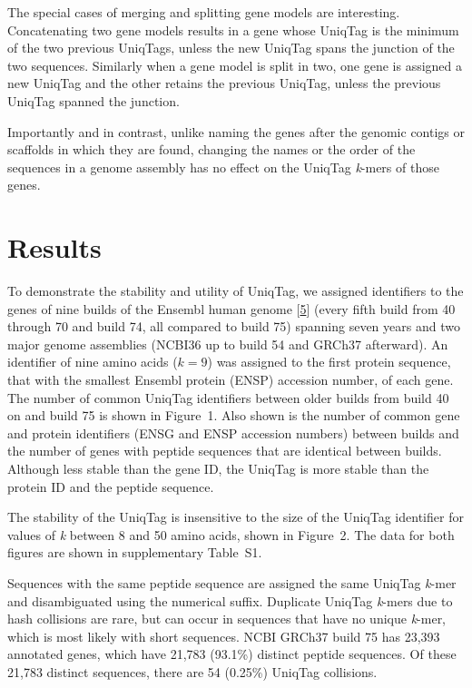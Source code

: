\documentclass[10pt]{article}
\begin{document}
The special cases of merging and splitting gene models are interesting.
Concatenating two gene models results in a gene whose UniqTag is the
minimum of the two previous UniqTags, unless the new UniqTag spans the
junction of the two sequences. Similarly when a gene model is split in
two, one gene is assigned a new UniqTag and the other retains the
previous UniqTag, unless the previous UniqTag spanned the junction.

Importantly and in contrast, unlike naming the genes after the genomic
contigs or scaffolds in which they are found, changing the names or the
order of the sequences in a genome assembly has no effect on the UniqTag
\emph{k}-mers of those genes.

\section{Results}\label{results}

To demonstrate the stability and utility of UniqTag, we assigned
identifiers to the genes of nine builds of the Ensembl human genome
{[}\href{http://dx.doi.org/10.1093/nar/gkt1196}{5}{]} (every fifth build
from 40 through 70 and build 74, all compared to build 75) spanning
seven years and two major genome assemblies (NCBI36 up to build 54 and
GRCh37 afterward). An identifier of nine amino acids (\(k=9\)) was
assigned to the first protein sequence, that with the smallest Ensembl
protein (ENSP) accession number, of each gene. The number of common
UniqTag identifiers between older builds from build 40 on and build 75
is shown in Figure~1. Also shown is the number of common gene and
protein identifiers (ENSG and ENSP accession numbers) between builds and
the number of genes with peptide sequences that are identical between
builds. Although less stable than the gene ID, the UniqTag is more
stable than the protein ID and the peptide sequence.

The stability of the UniqTag is insensitive to the size of the UniqTag
identifier for values of \emph{k} between 8 and 50 amino acids, shown in
Figure~2. The data for both figures are shown in supplementary Table~S1.

Sequences with the same peptide sequence are assigned the same UniqTag
\emph{k}-mer and disambiguated using the numerical suffix. Duplicate
UniqTag \emph{k}-mers due to hash collisions are rare, but can occur in
sequences that have no unique \emph{k}-mer, which is most likely with
short sequences. NCBI GRCh37 build 75 has 23,393 annotated genes, which
have 21,783 (93.1\%) distinct peptide sequences. Of these 21,783
distinct sequences, there are 54 (0.25\%) UniqTag collisions.
\end{document}
